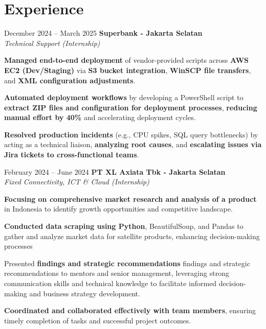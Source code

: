 \documentclass[../main.tex]{subfiles}
\begin{document}
\section{Experience}

\begin{twocolentry}{
		December 2024 – March 2025}
	\textbf{Superbank \color{Gray}- Jakarta Selatan}\\
	\textit{Technical Support (Internship)}
\end{twocolentry}

\vspace{0.10 cm}
\begin{onecolentry}
	\begin{highlights}
		\item \textbf{Managed end-to-end deployment} of vendor-provided scripts across \textbf{AWS EC2 (Dev/Staging)} via \textbf{S3 bucket integration}, \textbf{WinSCP file transfers}, and \textbf{XML configuration adjustments}.
		\item \textbf{Automated deployment workflows} by developing a PowerShell script to \textbf{extract ZIP files and configuration for deployment processes}, \textbf{reducing manual effort by 40\%} and accelerating deployment cycles.
		\item \textbf{Resolved production incidents} (e.g., CPU spikes, SQL query bottlenecks) by acting as a technical liaison, \textbf{analyzing root causes}, and \textbf{escalating issues via Jira tickets to cross-functional teams}.
	\end{highlights}
\end{onecolentry}

\vspace{0.40 cm}

\begin{twocolentry}{
		February 2024 – June 2024}
	\textbf{PT XL Axiata Tbk \color{Gray} - Jakarta Selatan}\\
	\textit{Fixed Connectivity, ICT \& Cloud (Internship)}
\end{twocolentry}

\vspace{0.10 cm}
\begin{onecolentry}
	\begin{highlights}
		\item \textbf{Focusing on comprehensive market research and analysis of a product} in Indonesia to identify growth opportunities and competitive landscape.
		\item \textbf{Conducted data scraping using Python}, BeautifulSoup, and Pandas to gather and analyze market data for satellite products, enhancing decision-making processes
		\item Presented \textbf{findings and strategic recommendations} findings and strategic recommendations to mentors and senior management, leveraging strong communication skills and technical knowledge to facilitate informed decision-making and business strategy development.
		\item \textbf{Coordinated and collaborated effectively with team members}, ensuring timely completion of tasks and successful project outcomes.
	\end{highlights}
\end{onecolentry}
\end{document}
